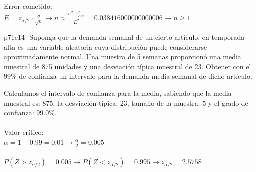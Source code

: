 \documentclass[spanish, 11pt]{exam}
\begin{document}
\begin{questions}
\begin{solution}
     \\
    Error cometido: \\ $E=z_{\alpha/2}\cdot \frac{\sigma}{\sqrt{n}} \to n \approx \frac{\sigma^2 \cdot z_{\alpha / 2}^2}{E^2}=0.038416000000000006 \to n \geq1$ \\    \end{solution}\question p71e14- Suponga que la demanda semanal de un cierto artículo, en temporada alta es una variable aleatoria cuya
distribución puede considerarse aproximadamente normal.
Una muestra de 5 semanas proporcionó una media muestral de 875 unidades y una desviación típica
muestral de 23. Obtener con el 99\% de confianza un intervalo para la demanda media semanal de dicho
artículo. \begin{solution}   Calculamos el intervalo de confianza para la media, sabiendo que la media muestral es: 875, la desviación típica: 23, tamaño de la muestra: 5 y el grado de confianza: 99.0\%. \\ \\ Valor crítico: \\ $\alpha=1-0.99=0.01\to \frac{\alpha}{2}=0.005$ \\ \\ $P(Z>z_{\alpha/2})=0.005\to P(Z<z_{\alpha/2})=0.995 \to z_{\alpha/2} =2.5758$ \\ 
\end{solution}
\end{questions}
\end{document}

